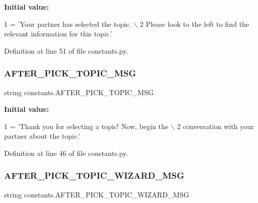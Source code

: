 {\bfseries Initial value\+:}
\begin{DoxyCode}
1 =  \textcolor{stringliteral}{'Your partner has selected the topic. \(\backslash\)}
2 \textcolor{stringliteral}{        Please look to the left to find the relevant information for this topic.'}
\end{DoxyCode}


Definition at line 51 of file constants.\+py.

\mbox{\label{namespaceconstants_a03deb02bcbfce040cb3032693984d549}} 
\subsubsection{\texorpdfstring{A\+F\+T\+E\+R\+\_\+\+P\+I\+C\+K\+\_\+\+T\+O\+P\+I\+C\+\_\+\+M\+SG}{AFTER\_PICK\_TOPIC\_MSG}}
{\footnotesize\ttfamily string constants.\+A\+F\+T\+E\+R\+\_\+\+P\+I\+C\+K\+\_\+\+T\+O\+P\+I\+C\+\_\+\+M\+SG}

{\bfseries Initial value\+:}
\begin{DoxyCode}
1 =  \textcolor{stringliteral}{'Thank you for selecting a topic! Now, begin the \(\backslash\)}
2 \textcolor{stringliteral}{        conversation with your partner about the topic.'}
\end{DoxyCode}


Definition at line 46 of file constants.\+py.

\mbox{\label{namespaceconstants_a9467c4e56b02e5074de9e47080de58d2}} 
\subsubsection{\texorpdfstring{A\+F\+T\+E\+R\+\_\+\+P\+I\+C\+K\+\_\+\+T\+O\+P\+I\+C\+\_\+\+W\+I\+Z\+A\+R\+D\+\_\+\+M\+SG}{AFTER\_PICK\_TOPIC\_WIZARD\_MSG}}
{\footnotesize\ttfamily string constants.\+A\+F\+T\+E\+R\+\_\+\+P\+I\+C\+K\+\_\+\+T\+O\+P\+I\+C\+\_\+\+W\+I\+Z\+A\+R\+D\+\_\+\+M\+SG}

